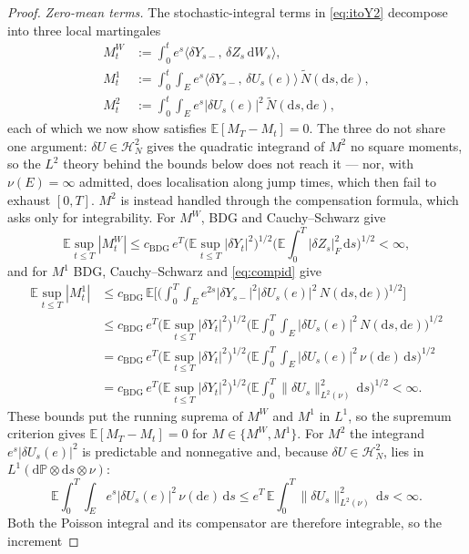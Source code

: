 \documentclass[preprint,12pt]{elsarticle}
\newcommand{\E}{\mathbb{E}}
\newcommand{\Prob}{\mathbb{P}}
\newcommand{\diff}{\mathrm{d}}
\newcommand{\Nt}{\widetilde{N}}
\newcommand{\inner}[2]{\langle #1,\,#2\rangle}
\newcommand{\Lnu}{L^2(\nu)}
\newcommand{\HN}{\mathcal{H}^2_N}
\newcommand{\Lnorm}[1]{\lVert #1\rVert_{\Lnu}}
\numberwithin{equation}{section}
\theoremstyle{plain}
\theoremstyle{definition}
\theoremstyle{\PaperRemarkStyle}
\begin{document}
\begin{proof}
\emph{Zero-mean terms.} The stochastic-integral terms in \eqref{eq:itoY2} decompose into three
local martingales
\[
\begin{aligned}
M^W_t&:=\int_0^t e^{s}\inner{\delta Y_{s-}}{\delta Z_s\,\diff W_s},\\
M^1_t&:=\int_0^t\!\int_E e^{s}\inner{\delta Y_{s-}}{\delta U_s(e)}\,\Nt(\diff s,\diff e),\\
M^2_t&:=\int_0^t\!\int_E e^{s}|\delta U_s(e)|^2\,\Nt(\diff s,\diff e),
\end{aligned}
\]
each of which we now show satisfies $\E[M_T-M_t]=0$. The three do not share one argument:
$\delta U\in\HN$ gives the quadratic integrand of $M^2$ no square moments, so the $L^2$
theory behind the bounds below does not reach it --- nor, with $\nu(E)=\infty$ admitted,
does localisation along jump times, which then fail to exhaust $[0,T]$. $M^2$ is instead
handled through the compensation formula, which asks only for integrability.
For $M^W$, BDG and Cauchy--Schwarz give
\[
\E\sup_{t\le T}|M^W_t|
\le c_{\mathrm{BDG}}\,e^{T}\big(\E\sup_{t\le T}|\delta Y_t|^2\big)^{1/2}
\Big(\E\!\int_0^T\!|\delta Z_s|_F^2\,\diff s\Big)^{1/2}<\infty ,
\]
and for $M^1$ BDG, Cauchy--Schwarz and \eqref{eq:compid} give
\begin{align*}
\E\sup_{t\le T}|M^1_t|
&\le c_{\mathrm{BDG}}\,\E\Big[\Big(\int_0^T\!\!\int_E e^{2s}|\delta Y_{s-}|^2|\delta U_s(e)|^2
\,N(\diff s,\diff e)\Big)^{1/2}\Big]\\
&\le c_{\mathrm{BDG}}\,e^{T}\big(\E\sup_{t\le T}|\delta Y_t|^2\big)^{1/2}
\Big(\E\!\int_0^T\!\!\int_E|\delta U_s(e)|^2\,N(\diff s,\diff e)\Big)^{1/2}\\
&=c_{\mathrm{BDG}}\,e^{T}\big(\E\sup_{t\le T}|\delta Y_t|^2\big)^{1/2}
\Big(\E\!\int_0^T\!\!\int_E|\delta U_s(e)|^2\,\nu(\diff e)\,\diff s\Big)^{1/2}\\
&=c_{\mathrm{BDG}}\,e^{T}\big(\E\sup_{t\le T}|\delta Y_t|^2\big)^{1/2}
\Big(\E\!\int_0^T\!\Lnorm{\delta U_s}^2\,\diff s\Big)^{1/2}<\infty .
\end{align*}
These bounds put the running suprema of $M^W$ and $M^1$ in $L^1$, so the supremum
criterion gives $\E[M_T-M_t]=0$ for $M\in\{M^W,M^1\}$.
For $M^2$ the integrand $e^{s}|\delta U_s(e)|^2$ is predictable and nonnegative and,
because $\delta U\in\HN$, lies in $L^1(\diff\Prob\otimes\diff s\otimes\nu)$:
\[
\E\!\int_0^T\!\!\int_E e^{s}|\delta U_s(e)|^2\,\nu(\diff e)\,\diff s
\le e^{T}\,\E\!\int_0^T\!\Lnorm{\delta U_s}^2\,\diff s<\infty .
\]
Both the Poisson integral and its compensator are therefore integrable, so the increment

\end{proof}
\end{document}

